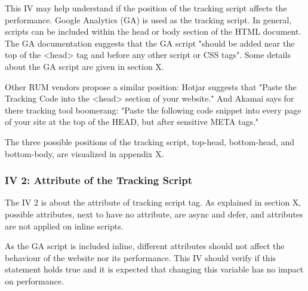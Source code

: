 
This IV may help understand if the position of the tracking script affects the performance.
Google Analytics (GA) is used as the tracking script.
In general, scripts can be included within the head or body section of the HTML document. %
The GA documentation suggests that the GA script "should be added near the top of the <head> tag and before any other script or CSS tags".
Some details about the GA script are given in section X.


Other RUM vendors propose a similar position:
Hotjar suggests that "Paste the Tracking Code into the <head> section of your website."
And Akamai says for there tracking tool boomerang:
"Paste the following code snippet into every page of your site at the top of the HEAD, but after sensitive META tags."

The three possible positions of the tracking script, top-head, bottom-head, and bottom-body, are visualized in appendix X.






\subsubsection{IV 2: Attribute of the Tracking Script}

The IV 2 is about the attribute of tracking script tag.
As explained in section X, possible attributes, next to have no attribute, are async and defer, and attributes are not applied on inline scripts.

As the GA script is included inline, different attributes should not affect the behaviour of the website nor its performance.
This IV should verify if this statement holds true and it is expected that changing this variable has no impact on performance.

